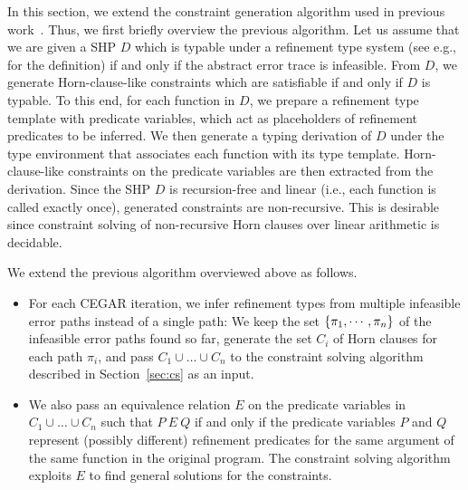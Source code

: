 In this section, we extend the constraint generation algorithm used in 
previous work~\cite{Unno2009,Terauchi2010,KobayashiPLDI2011}.  Thus, we 
first briefly overview the previous algorithm.  Let us assume that we 
are given a SHP \(D\) which is typable under a refinement type system 
(see e.g., \cite{Unno2009} for the definition) if and only if the 
abstract error trace is infeasible.  From \(D\), we generate 
Horn-clause-like constraints which are satisfiable if and only if \(D\) 
is typable.  To this end, for each function in \(D\), we prepare a 
refinement type template with predicate variables, which act as 
placeholders of refinement predicates to be inferred.  We then generate 
a typing derivation of \(D\) under the type environment that associates 
each function with its type template.  Horn-clause-like constraints on 
the predicate variables are then extracted from the derivation.  Since 
the SHP \(D\) is recursion-free and linear (i.e., each function is 
called exactly once), generated constraints are non-recursive.  This is 
desirable since constraint solving of non-recursive Horn clauses over 
linear arithmetic is decidable. 

We extend the previous algorithm overviewed above as follows.
\begin{itemize}
\item For each CEGAR iteration, we infer refinement types from multiple 
infeasible error paths instead of a single path:  We keep the set 
\(\{{\pi_1,\cdots,\pi_n}\}\) of the infeasible error paths found so far, 
generate the set \(C_i\) of Horn clauses for each path \(\pi_i\), and 
pass \(C_1 \cup \dots \cup C_n\) to the constraint solving algorithm 
described in Section~\ref{sec:cs} as an input.
\item We also pass an equivalence relation \(E\) on the predicate 
variables in \(C_1 \cup \dots \cup C_n\) such that \(P\ E\ Q\) if and 
only if the predicate variables \(P\) and \(Q\) represent (possibly 
different) refinement predicates for the same argument of the same 
function in the original program.    The constraint 
solving algorithm exploits \(E\) to find general solutions for the 
constraints.
\end{itemize}



